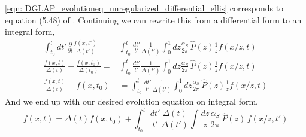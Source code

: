 \documentclass[main.tex]{subfiles}
\begin{document}
\autoref{eqn: DGLAP_evolutioneq_unregularized_differential_ellis} corresponds to equation (5.48) of \cite{ellis_stirling_webber_1996}. Continuing we can rewrite this from a differential form to an integral form,
\begin{align}
    \int_{t_0}^t dt' \frac{\partial}{\partial t} \frac{f(x,t')}{\Delta(t')} = &\int_{t_0}^{t} \frac{dt'}{t'} \frac{1}{\Delta(t')} \int_0^1 dz \frac{\alpha_S}{2\pi} \, \hat{P}(z) \frac{1}{z} f(x/z, t) \nonumber\\
    \frac{f(x,t)}{\Delta(t)} - \frac{f(x,t_0)}{\Delta(t_0)} = &\int_{t_0}^{t} \frac{dt'}{t'} \frac{1}{\Delta(t')} \int_0^1 dz \frac{\alpha_S}{2\pi} \, \hat{P}(z) \frac{1}{z} f(x/z, t) \nonumber\\
    \frac{f(x,t)}{\Delta(t)} - f(x,t_0) &= \int_{t_0}^{t} \frac{dt'}{t'} \frac{1}{\Delta(t')} \int_0^1 dz \frac{\alpha_S}{2\pi} \, \hat{P}(z) \frac{1}{z} f(x/z, t)
\end{align}
And we end up with our desired evolution equation on integral form, 
\begin{equation}\label{eqn: DGLAP_evolutioneq_unregularized_integral_ellis}
    f(x,t) =  \Delta(t) f(x,t_0) + \int_{t_0}^{t} \frac{dt'}{t'} \frac{\Delta(t)}{\Delta(t')} \int \frac{dz}{z} \frac{\alpha_S}{2\pi} \, \hat{P}(z) \, f(x/z, t')
\end{equation}
\end{document}
